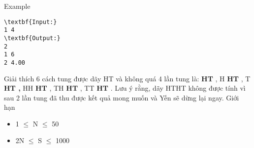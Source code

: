 Example
\begin{verbatim}
\textbf{Input:}
1 4
\textbf{Output:}
2
1 6
2 4.00\end{verbatim}
Giải thích
6 cách tung được dãy HT và không quá 4 lần tung là: \textbf{HT} , H \textbf{HT} , T \textbf{ HT , } HH \textbf{HT} , TH \textbf{HT} , TT \textbf{ HT} . Lưu ý rằng, dãy HTHT không được tính vì sau 2 lần tung đã thu được kết quả mong muốn và Yến sẽ dừng lại ngay.
Giới hạn
\begin{itemize}
	\item 1  $\le$  N  $\le$  50
	\item 2N  $\le$  S  $\le$  1000
\end{itemize}
 